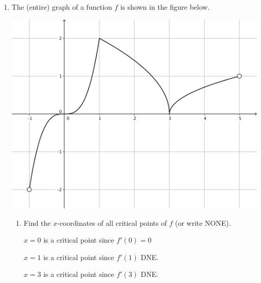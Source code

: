 \documentclass[nooutcomes]{ximera}
\begin{document}
\begin{problem}

  \begin{enumerate}
    \item
      The (entire) graph of a function $f$ is shown in the figure below.
      \begin{image}
        \includegraphics[scale = 0.3]{figure3.png}
      \end{image}
      \begin{enumerate}
        \item
          Find the $x$-coordinates of all critical points of $f$ (or write NONE).
          \begin{freeResponse}
            $x = 0$ is a critical point since $f'(0) = 0$

            $x = 1$ is a critical point since $f'(1)$ DNE.

            $x = 3$ is a critical point since $f'(3)$ DNE.
          \end{freeResponse}


\end{enumerate}
\end{enumerate}
\end{problem}
\end{document}
